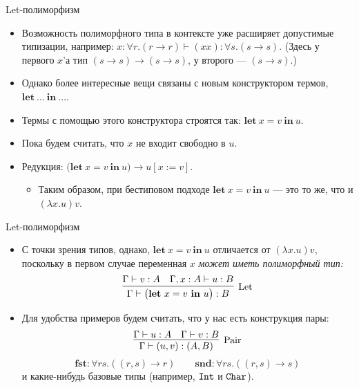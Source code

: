 \documentclass[xcolor=dvipsnames]{beamer}
\newcommand{\letin}[2]{\mathbf{let}\ {#1}\ \mathbf{in}\ {#2}}
\newcommand{\Int}{\mbox{\texttt{Int}}}
\newcommand{\Char}{\mbox{\texttt{Char}}}
\begin{document}
\begin{frame}{Let-полиморфизм}
 \begin{itemize}[<+->]
  \item Возможность полиморфного типа в контексте уже расширяет допустимые типизации, например: $x : \forall r. (r \to r) \vdash (xx) : \forall s. (s \to s)$. (Здесь у первого $x$'а тип $(s \to s) \to (s \to s)$, у второго --- $(s \to s)$.)
  \item Однако более интересные вещи связаны с новым конструктором термов, $\letin{\ldots}{\ldots}$.
  \item Термы с помощью этого конструктора строятся так: $\letin{x = v}{u}$.
  \item Пока будем считать, что $x$ не входит свободно в $u$.
  \item Редукция: $\bigl(\letin{x = v}{u}\bigr) \to
  u[x:=v]$.
  \begin{itemize}
  \item Таким образом, при бестиповом подходе $\letin{x = v}{u}$ --- это то же, что и $(\lambda x. u)v$.
  \end{itemize}
 \end{itemize}

\end{frame}

\begin{frame}{Let-полиморфизм}
 
 \begin{itemize}[<+->]
  \item С точки зрения типов, однако, $\letin{x=v}{u}$ отличается от $(\lambda x .u)v$, поскольку в первом случае переменная $x$ {\em может иметь полиморфный тип:}
  \[
   \infer[\mathrm{Let}]
   {\Gamma  \vdash \bigl( \letin{x=v}{u}
   \bigr) : B}
   {\Gamma \vdash v : A & \Gamma, x : A \vdash u : B}
  \]
  \item Для удобства примеров будем считать, что у нас есть конструкция пары:
  \[
   \infer[\mathrm{Pair}]
   {\Gamma \vdash (u,v) : (A,B)}
   {\Gamma \vdash u : A & \Gamma \vdash v : B}
  \]
  \[
   \mathbf{fst} : \forall r s. ((r,s) \to r) \qquad
   \mathbf{snd} : \forall r s. ((r,s) \to s)
  \]
  и какие-нибудь базовые типы (например, $\Int$ и $\Char$).
 \end{itemize}

 
\end{frame}
\end{document}
